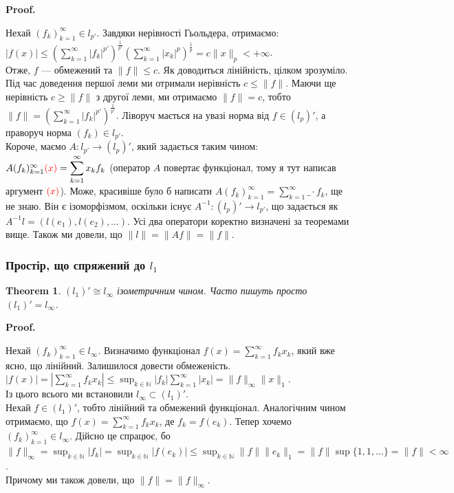 \documentclass[a4paper, 10pt]{article}
\makeatletter
\theoremstyle{theoremdd}
\newtheorem{theorem}{Theorem}[subsection]
\theoremstyle{theoremdd}
\theoremstyle{theoremdd}
\theoremstyle{theoremdd}
\theoremstyle{theoremdd}
\theoremstyle{theoremdd}
\theoremstyle{theoremdd}
\theoremstyle{theoremdd}
\renewenvironment{proof}[1][Proof.\\]{\par
\pushQED{\hfill \qed}%
\normalfont \topsep6\p@\@plus6\p@\relax
\trivlist
\item\relax
{\bfseries
#1\@addpunct{.}}\hspace\labelsep\ignorespaces
}{%
\popQED\endtrivlist\@endpefalse
}
\makeatother
\begin{document}
\begin{proof}
Нехай $(f_k)_{k=1}^\infty \in l_{p'}$. Завдяки нерівності Гьольдера, отримаємо:\\
$\displaystyle |f(x)| \leq \left( \sum_{k=1}^\infty |f_k|^{p'} \right)^{\frac{1}{p'}} \left( \sum_{k=1}^\infty |x_k|^p \right)^{\frac{1}{p}} = c \| x \|_p < +\infty$.\\
Отже, $f$ --- обмежений та $\|f\| \leq c$. Як доводиться лінійність, цілком зрозуміло.
\end{proof}
\noindent
Під час доведення першої леми ми отримали нерівність $c \leq \|f\|$. Маючи ще нерівність $c \geq \|f\|$ з другої леми, ми отримаємо $\|f\| = c$, тобто $\|f\| =  \displaystyle\left( \sum_{k=1}^\infty |f_k|^{p'} \right)^{\frac{1}{p'}}$. Ліворуч мається на увазі норма від $f \in (l_p)'$, а праворуч норма $(f_k) \in l_{p'}$.
\bigskip \\
Короче, маємо $A \colon l_{p'} \to (l_p)'$, який задається таким чином: $A (f_k)_{k=1}^\infty \color{red}(x) \color{black} = \displaystyle\sum_{k=1}^\infty x_k f_k$ (оператор $A$ повертає функціонал, тому я тут написав аргумент $\color{red}(x)$). Може, красивіше було б написати $A (f_k)_{k=1}^\infty = \displaystyle\sum_{k=1}^\infty \_ \cdot f_k$, ще не знаю. Він є ізоморфізмом, оскільки існує $A^{-1} \colon (l_p)' \to l_{p'}$, що задається як $A^{-1}l = (l(e_1),l(e_2),\dots)$. Усі два оператори коректно визначені за теоремами вище. Також ми довели, що $\|l\| = \| Af \| = \| f \|$.

\subsubsection{Простір, що спряжений до $l_1$}
\begin{theorem}
$(l_1)' \cong l_\infty$ ізометричним чином. Часто пишуть просто $(l_1)' = l_\infty$.
\end{theorem}

\begin{proof}
Нехай $(f_k)^{\infty}_{k=1} \in l_{\infty}$. Визначимо функціонал $f(x) = \displaystyle\sum_{k=1}^\infty f_k x_k$, який вже ясно, що лінійний. Залишилося довести обмеженість.\\
$|f(x)| = \displaystyle \left| \sum_{k=1}^\infty f_k x_k \right| \leq \sup_{k \in \mathbb{N}} |f_k| \sum_{k=1}^\infty |x_k| = \|f\|_\infty \|x\|_1$.\\
Із цього всього ми встановили $l_\infty \subset (l_1)'$.\\
Нехай $f \in (l_1)'$, тобто лінійний та обмежений функціонал. Аналогічним чином отримаємо, що $f(x) = \displaystyle\sum_{k=1}^\infty f_k x_k$, де $f_k = f(e_k)$. Тепер хочемо $(f_k)^{\infty}_{k=1} \in l_\infty$. Дійсно це спрацює, бо\\
$\|f\|_\infty = \displaystyle\sup_{k \in \mathbb{N}} |f_k| = \sup_{k \in \mathbb{N}} |f(e_k)| \leq \sup_{k \in \mathbb{N}} \|f\| \|e_k\|_1 = \|f\| \sup \{1,1,\dots\} = \|f\| < \infty$.\\
Причому ми також довели, що $\|f\| = \|f\|_\infty$.
\end{proof}
\end{document}
